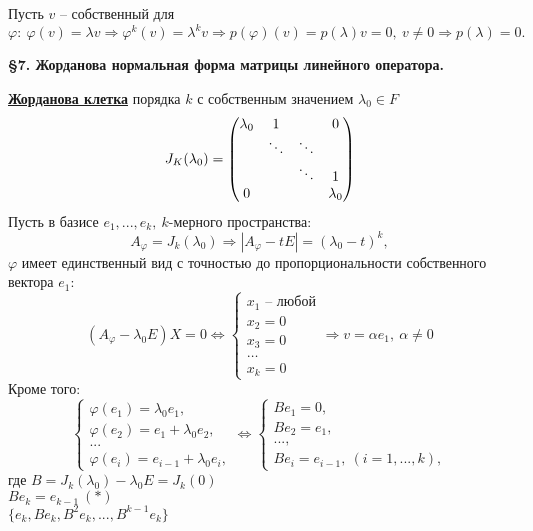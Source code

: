 \documentclass[a4paper, 12pt]{article}
\theoremstyle{definition}
\begin{document}
    Пусть $v$ -- собственный для $\varphi:\ \varphi(v) = 
    \lambda v \Longrightarrow \varphi^k(v) = \lambda^kv
    \Longrightarrow p(\varphi)(v) = p(\lambda)v = 0,\ v \neq 0
    \Longrightarrow p(\lambda) = 0.$
    \newpage
    \begin{center}
        \begin{Large}
            \textbf{\S 7. Жорданова нормальная форма матрицы
            линейного оператора.} 
        \end{Large}
    \end{center}
    \underline{\textbf{Жорданова клетка}} порядка $k$ с собственным
    значением $\lambda_0 \in F$
    $$J_K(\lambda_0) = 
    \begin{pmatrix}
        \lambda_0 & 1 & \null & 0\\
        \null & \ddots & \ddots & \null\\
        \null & \null & \ddots & 1\\
        0 & \null & \null & \lambda_0
    \end{pmatrix}
    $$
    Пусть в базисе $e_1,...,e_k,\ k$-мерного пространства:
    $$A_\varphi  =J_k(\lambda_0) \Longrightarrow |A_\varphi
    - t E| = (\lambda_0 - t)^k,$$ $\varphi$ имеет 
    единственный вид с точностью до пропорциональности
    собственного вектора $e_1:$$$(A_\varphi - \lambda_0 E)X = 0
    \Longleftrightarrow 
    \begin{cases}
        x_1 \text{ -- любой}\\x_2 = 0\\x_3 = 0\\\dots\\x_k = 0
    \end{cases}  \Longrightarrow 
    v = \alpha e_1,\ \alpha \neq 0$$  
    Кроме того:
    $$\begin{cases}
        \varphi(e_1) = \lambda_0e_1,\\
        \varphi(e_2) = e_1 + \lambda_0e_2,\\...
        \\\varphi(e_i) = e_{i-1} + \lambda_0e_i,
    \end{cases} \Longleftrightarrow  
    \begin{cases}
        Be_1 = 0,\\ Be_2 = e_1,\\...,\\
    Be_i = e_{i-1},\ (i = 1,...,k),
    \end{cases}$$где $B = J_k(\lambda_0) - \lambda_0E = J_k(0)$ 
    \\$Be_k = e_{k-1}\ (*)$\\$\{e_k, Be_k, B^2e_k,...,B^{k-1}e_k\}$
\end{document}
